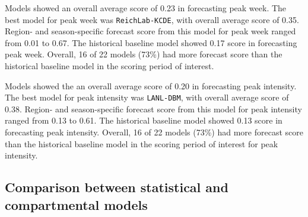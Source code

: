\documentclass{article}\usepackage[]{graphicx}\usepackage[]{color}
\begin{document}
Models showed an overall average score of 
0.23
in forecasting peak week. 
The best model for peak week was 
{\tt ReichLab-KCDE}, 
with overall average score of 
0.35. 
Region- and season-specific forecast score from this model for peak week ranged from
0.01 to 
0.67.
The historical baseline model showed 
0.17 
score in forecasting peak week.
Overall, 16 of 22 models (73\%) had more forecast score than the historical baseline model in the scoring period of interest.

Models showed the an overall average score of 
0.20
in forecasting peak intensity. 
The best model for peak intensity was 
{\tt LANL-DBM}, 
with overall average score of 
0.38. 
Region- and season-specific forecast score from this model for peak intensity ranged from
0.13 to 
0.61.
The historical baseline model showed 
0.13 
score in forecasting peak intensity.
Overall, 16 of 22 models (73\%) had more forecast score than the historical baseline model in the scoring period of interest for peak intensity.

% 
% 
% 


\subsection{Comparison between statistical and compartmental models} \label{sec:stat-mech}
\end{document}
